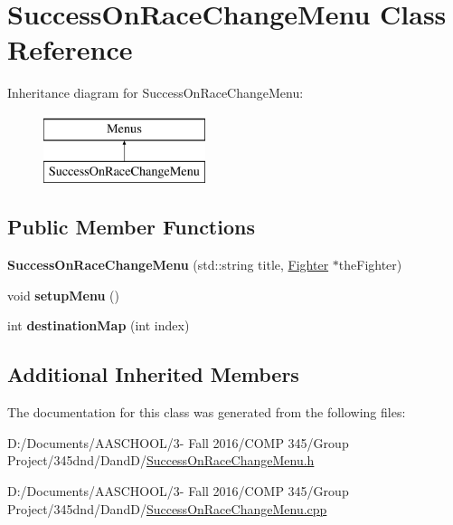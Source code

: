 \hypertarget{class_success_on_race_change_menu}{}\section{Success\+On\+Race\+Change\+Menu Class Reference}
\label{class_success_on_race_change_menu}
Inheritance diagram for Success\+On\+Race\+Change\+Menu\+:\begin{figure}[H]
\begin{center}
\leavevmode
\includegraphics[height=2.000000cm]{class_success_on_race_change_menu}
\end{center}
\end{figure}
\subsection*{Public Member Functions}
\begin{DoxyCompactItemize}
\item 
\hypertarget{class_success_on_race_change_menu_afb1cda94922c2a8217d77020be3f16f0}{}\label{class_success_on_race_change_menu_afb1cda94922c2a8217d77020be3f16f0} 
{\bfseries Success\+On\+Race\+Change\+Menu} (std\+::string title, \hyperlink{class_fighter}{Fighter} $\ast$the\+Fighter)
\item 
\hypertarget{class_success_on_race_change_menu_a86ab5fd6afa808fb77de0a8ff34aa1ce}{}\label{class_success_on_race_change_menu_a86ab5fd6afa808fb77de0a8ff34aa1ce} 
void {\bfseries setup\+Menu} ()
\item 
\hypertarget{class_success_on_race_change_menu_a8d9365aa6f0c9626f78de7276e69fe88}{}\label{class_success_on_race_change_menu_a8d9365aa6f0c9626f78de7276e69fe88} 
int {\bfseries destination\+Map} (int index)
\end{DoxyCompactItemize}
\subsection*{Additional Inherited Members}


The documentation for this class was generated from the following files\+:\begin{DoxyCompactItemize}
\item 
D\+:/\+Documents/\+A\+A\+S\+C\+H\+O\+O\+L/3-\/ Fall 2016/\+C\+O\+M\+P 345/\+Group Project/345dnd/\+Dand\+D/\hyperlink{_success_on_race_change_menu_8h}{Success\+On\+Race\+Change\+Menu.\+h}\item 
D\+:/\+Documents/\+A\+A\+S\+C\+H\+O\+O\+L/3-\/ Fall 2016/\+C\+O\+M\+P 345/\+Group Project/345dnd/\+Dand\+D/\hyperlink{_success_on_race_change_menu_8cpp}{Success\+On\+Race\+Change\+Menu.\+cpp}\end{DoxyCompactItemize}
